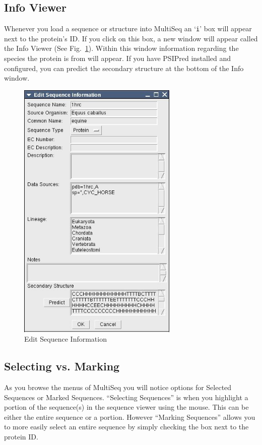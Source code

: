 
\subsection{Info Viewer}
Whenever you load a sequence or structure into MultiSeq an `\texttt{i}' box will
appear next to the protein's ID.  If you click on this box, a new
window will appear called the \textsf{Info Viewer} (See
Fig.~\ref{fig:editSeqInfoWindow}).  Within this window
information regarding the species the protein is from will appear. If
you have PSIPred installed and configured, you can predict the secondary
structure at the bottom of the Info window.
\begin{figure}[here]
 \centerline{\includegraphics [width=3in]{./pictures/editSeqInfo.jpg}}
 \caption{Edit Sequence Information}%
 \label{fig:editSeqInfoWindow}
\end{figure}

\subsection{Selecting vs. Marking}
As you browse the menus of MultiSeq you will notice options for
\textsf{Selected Sequences} or \textsf{Marked Sequences}.  ``Selecting
Sequences'' is when you highlight a portion of the sequence(s) in the
sequence viewer using the mouse.  This can be either the entire sequence
or a portion.  However ``Marking Sequences'' allows you to more easily
select an entire sequence by simply checking the box next to the protein
ID.




